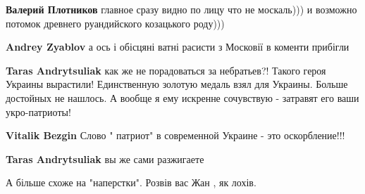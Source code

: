 \begin{itemize}
\begin{itemize}
\textbf{Валерий Плотников} главное сразу видно по лицу что не москаль))) и возможно потомок древнего руандийского козацького роду)))

 
\textbf{Andrey Zyablov} а ось і обісцяні ватні расисти з Московії в коменти прибігли

 
\textbf{Taras Andrytsuliak} как же не порадоваться за небратьев?! Такого героя Украины вырастили! Единственную золотую медаль взял для Украины. Больше достойных не нашлось. А вообще я ему искренне сочувствую - затравят его ваши укро-патриоты!

 
\textbf{Vitalik Bezgin}
Слово " патриот" в современной Украине - это оскорбление!!!

 
\textbf{Taras Andrytsuliak} вы же сами разжигаете

 
А більше схоже на "наперстки". Розвів вас Жан , як лохів.

 

\end{itemize}
\end{itemize}
